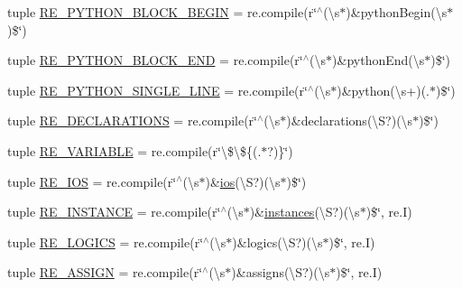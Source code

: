 \begin{DoxyCompactItemize}
\item 
tuple \hyperlink{namespaceverilog__generator_aaa6dff7070364c2a3d96814f1efc53e8}{R\-E\-\_\-\-P\-Y\-T\-H\-O\-N\-\_\-\-B\-L\-O\-C\-K\-\_\-\-B\-E\-G\-I\-N} = re.\-compile(r\char`\"{}$^\wedge$(\textbackslash{}s$\ast$)\&python\-Begin(\textbackslash{}s$\ast$)\$\char`\"{})
\item 
tuple \hyperlink{namespaceverilog__generator_a2349535564e100a6d65a2146bf0f8bbd}{R\-E\-\_\-\-P\-Y\-T\-H\-O\-N\-\_\-\-B\-L\-O\-C\-K\-\_\-\-E\-N\-D} = re.\-compile(r\char`\"{}$^\wedge$(\textbackslash{}s$\ast$)\&python\-End(\textbackslash{}s$\ast$)\$\char`\"{})
\item 
tuple \hyperlink{namespaceverilog__generator_aa77385c9f3ed119e28172c750844d448}{R\-E\-\_\-\-P\-Y\-T\-H\-O\-N\-\_\-\-S\-I\-N\-G\-L\-E\-\_\-\-L\-I\-N\-E} = re.\-compile(r\char`\"{}$^\wedge$(\textbackslash{}s$\ast$)\&python(\textbackslash{}s+)(.$\ast$)\$\char`\"{})
\item 
tuple \hyperlink{namespaceverilog__generator_a17458264d0df5cb836d925e8cf2ec56f}{R\-E\-\_\-\-D\-E\-C\-L\-A\-R\-A\-T\-I\-O\-N\-S} = re.\-compile(r\char`\"{}$^\wedge$(\textbackslash{}s$\ast$)\&declarations(\textbackslash{}S?)(\textbackslash{}s$\ast$)\$\char`\"{})
\item 
tuple \hyperlink{namespaceverilog__generator_ac42330437a8a95b3a482073d5c6791d3}{R\-E\-\_\-\-V\-A\-R\-I\-A\-B\-L\-E} = re.\-compile(r\char`\"{}\textbackslash{}\$\textbackslash{}\$\{(.$\ast$?)\}\char`\"{})
\item 
tuple \hyperlink{namespaceverilog__generator_ac53d8e583f512c430c2e1c3ddff585e4}{R\-E\-\_\-\-I\-O\-S} = re.\-compile(r\char`\"{}$^\wedge$(\textbackslash{}s$\ast$)\&\hyperlink{namespaceverilog__generator_ade554169d988ab15567d5895be125e8a}{ios}(\textbackslash{}S?)(\textbackslash{}s$\ast$)\$\char`\"{})
\item 
tuple \hyperlink{namespaceverilog__generator_ac2a164628a1ed9048df4807c3e001bd2}{R\-E\-\_\-\-I\-N\-S\-T\-A\-N\-C\-E} = re.\-compile(r\char`\"{}$^\wedge$(\textbackslash{}s$\ast$)\&\hyperlink{namespaceverilog__generator_abfdc641e6360d79d9e9df91867d89549}{instances}(\textbackslash{}S?)(\textbackslash{}s$\ast$)\$\char`\"{}, re.\-I)
\item 
tuple \hyperlink{namespaceverilog__generator_a767602e234555709fb8829fe493912ff}{R\-E\-\_\-\-L\-O\-G\-I\-C\-S} = re.\-compile(r\char`\"{}$^\wedge$(\textbackslash{}s$\ast$)\&logics(\textbackslash{}S?)(\textbackslash{}s$\ast$)\$\char`\"{}, re.\-I)
\item 
tuple \hyperlink{namespaceverilog__generator_ac99e807a3e07ae1108785072dc553db5}{R\-E\-\_\-\-A\-S\-S\-I\-G\-N} = re.\-compile(r\char`\"{}$^\wedge$(\textbackslash{}s$\ast$)\&assigns(\textbackslash{}S?)(\textbackslash{}s$\ast$)\$\char`\"{}, re.\-I)

\end{DoxyCompactItemize}
